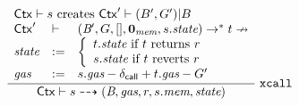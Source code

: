 \begin{table}[ht]
$$
\begin{array}{c}
\dfrac{
    \begin{array}{lll}
    \multicolumn{3}{l}{\textrm{$\ctx\vdash s$ creates $\ctx'\vdash (B',G')|B$}}\\
     \mathsf{\ctx'}&\vdash& 
     (\bytecode{}{}',G,[],\zMem,s.\state) \to^* t \nrightarrow\\
     \state &:=& \left\{
    \begin{array}{l}
        \textrm{$t.\state$ if $t$ returns $r$}\\
        \textrm{$s.\state$ if $t$ reverts $r$}
    \end{array}\right.\\
    \textit{gas} &:=& s.\textit{gas}-\dcl+t.\textit{gas}-G'
    \end{array}
}{
 \ctx
 \vdash
 s
 \rar 
 (\bytecode,\textit{gas},r,s.\textit{mem},
 \state
 )
}\rlab{xcall}
\end{array}
$$
\end{table}

